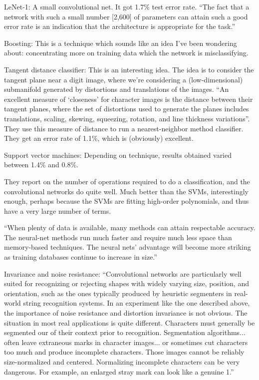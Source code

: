 \documentclass[12pt]{report}
\begin{document}
LeNet-1: A small convolutional net.  It got 1.7\% test error rate.
``The fact that a network with such a small number [2,600] of
parameters can attain such a good error rate is an indication that the
architecture is appropriate for the task.''

Boosting: This is a technique which sounds like an idea I've been
wondering about: concentrating more on training data which the network
is misclassifying.

Tangent distance classifier: This is an interesting idea.  The idea is
to consider the tangent plane near a digit image, where we're
considering a (low-dimensional) submanifold generated by distortions
and translations of the images.  ``An excellent measure of `closeness'
for character images is the distance between their tangent planes,
where the set of distortions used to generate the planes includes
translations, scaling, skewing, squeezing, rotation, and line
thickness variations''.  They use this measure of distance to run a
nearest-neighbor method classifier.  They get an error rate of 1.1\%,
which is (obviously) excellent.

Support vector machines: Depending on technique, results obtained
varied between 1.4\% and 0.8\%.

They report on the number of operations required to do a
classification, and the convolutional networks do quite well.  Much
better than the SVMs, interestingly enough, perhaps because the SVMs
are fitting high-order polynomials, and thus have a very large number
of terms.

``When plenty of data is available, many methods can attain
respectable accuracy.  The neural-net methods run much faster and
require much less space than memory-based techniques.  The neural
nets' advantage will become more striking as training databases
continue to increase in size.''

Invariance and noise resistance: ``Convolutional networks are
particularly well suited for recognizing or rejecting shapes with
widely varying size, position, and orientation, such as the ones
typically produced by heuristic segmenters in real-world string
recognition systems.  In an experiment like the one described above,
the importance of noise resistance and distortion invariance is not
obvious.  The situation in most real applications is quite different.
Characters must generally be segmented our of their context prior to
recognition.  Segmentation algorithms... often leave extraneous marks
in character images... or sometimes cut characters too much and
produce incomplete characters.  Those images cannot be reliably
size-normalized and centered.  Normalizing incomplete characters can
be very dangerous.  For example, an enlarged stray mark can look like
a genuine 1.''
\end{document}
